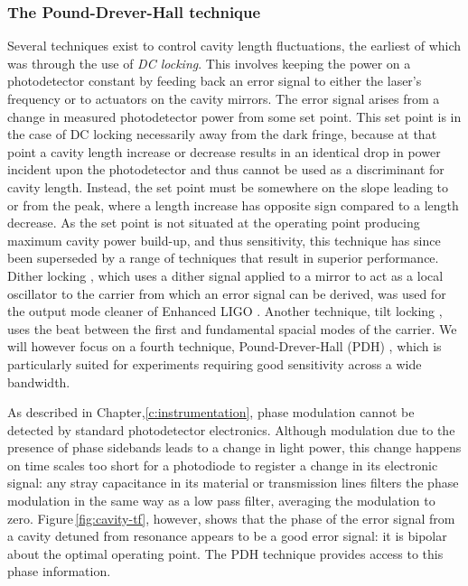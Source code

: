 \subsubsection{\label{sec:pdh}The Pound-Drever-Hall technique}
Several techniques exist to control cavity length fluctuations, the earliest of which was through the use of \emph{\gls{DC} locking}. This involves keeping the power on a photodetector constant by feeding back an error signal to either the laser's frequency or to actuators on the cavity mirrors. The error signal arises from a change in measured photodetector power from some set point. This set point is in the case of \gls{DC} locking necessarily away from the dark fringe, because at that point a cavity length increase or decrease results in an identical drop in power incident upon the photodetector and thus cannot be used as a discriminant for cavity length. Instead, the set point must be somewhere on the slope leading to or from the peak, where a length increase has opposite sign compared to a length decrease. As the set point is not situated at the operating point producing maximum cavity power build-up, and thus sensitivity, this technique has since been superseded by a range of techniques that result in superior performance. Dither locking \cite{White1965}, which uses a dither signal applied to a mirror to act as a local oscillator to the carrier from which an error signal can be derived, was used for the output mode cleaner of Enhanced LIGO \cite{Ward2008}. Another technique, tilt locking \cite{Shaddock1999}, uses the beat between the first and fundamental spacial modes of the carrier. We will however focus on a fourth technique, Pound-Drever-Hall (\gls{PDH}) \cite{Drever1983, Black2001}, which is particularly suited for \FP{} experiments requiring good sensitivity across a wide bandwidth.

As described in Chapter,\ref{c:instrumentation}, phase modulation cannot be detected by standard photodetector electronics. Although modulation due to the presence of phase sidebands leads to a change in light power, this change happens on time scales too short for a photodiode to register a change in its electronic signal: any stray capacitance in its material or transmission lines filters the phase modulation in the same way as a low pass filter, averaging the modulation to zero. Figure\,\ref{fig:cavity-tf}, however, shows that the phase of the error signal from a cavity detuned from resonance appears to be a good error signal: it is bipolar about the optimal operating point. The \gls{PDH} technique provides access to this phase information.

